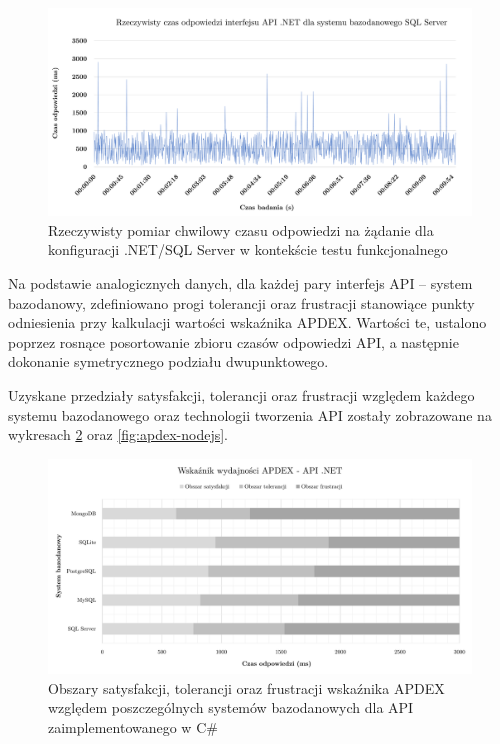 \begin{figure}[htb]
    \centering
     \includegraphics[width=\linewidth]{rys05/testy-funkcjonalne-dotnet.pdf}
    \caption{Rzeczywisty pomiar chwilowy czasu odpowiedzi na żądanie dla konfiguracji .NET/SQL Server w kontekście testu funkcjonalnego}
    \label{fig:wykres-testy-funkcjonalne-dotnet}
\end{figure}

Na podstawie analogicznych danych, dla każdej pary interfejs API -- system bazodanowy, zdefiniowano progi tolerancji oraz frustracji stanowiące punkty odniesienia przy kalkulacji wartości wskaźnika APDEX. Wartości te, ustalono poprzez rosnące posortowanie zbioru czasów odpowiedzi API, a następnie dokonanie symetrycznego podziału dwupunktowego.

Uzyskane przedziały satysfakcji, tolerancji oraz frustracji względem każdego systemu bazodanowego oraz technologii tworzenia API zostały zobrazowane na wykresach \ref{fig:apdex-dotnet} oraz \ref{fig:apdex-nodejs}.

\begin{figure}[htb]
    \centering
     \includegraphics[width=\linewidth]{rys05/apdex-dotnet.pdf}
    \caption{Obszary satysfakcji, tolerancji oraz frustracji wskaźnika APDEX względem poszczególnych systemów bazodanowych dla API zaimplementowanego w C\#}
    \label{fig:apdex-dotnet}
\end{figure}


